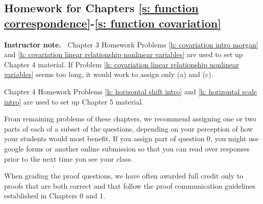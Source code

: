 \documentclass[11pt]{article}
\newenvironment{bignote}[1][Instructor note]%
	{\begin{mdframed}\raggedright{\bf #1.~}}
	{\end{mdframed}}
\theoremstyle{definition}
\begin{document}
\newpage \subsection{Homework for Chapters \ref{s: function correspondence}-\ref{s: function covariation}}


\begin{bignote}
Chapter 3 Homework Problems \ref{h: covariation intro morgan} and \ref{h: covariation linear relationship nonlinear variables} are used to set up Chapter 4 material. If Problem \ref{h: covariation linear relationship nonlinear variables} seems too long, it would work to assign only (a) and (c).

Chapter 4 Homework Problems \ref{h: horizontal shift intro} and \ref{h: horizontal scale intro} are used to set up Chapter 5 material.

From remaining problems of these chapters, we recommend assigning one or two parts of each of a subset of the questions, depending on your perception of how your students would most benefit. If you assign part of question 0, you might use google forms or another online submission so that you can read over responses prior to the next time you see your class. 

When grading the proof questions, we have often awarded full credit only to proofs that are both correct and that follow the proof communication guidelines established in Chapters 0 and 1. 


\end{bignote}
\end{document}
